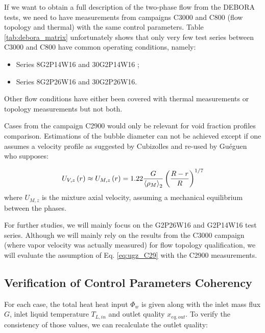 If we want to obtain a full description of the two-phase flow from the DEBORA tests, we need to have measurements from campaigns C3000 and C800 (flow topology and thermal) with the same control parameters. Table \ref{tab:debora_matrix} unfortunately shows that only very few test series between C3000 and C800 have common operating conditions, namely:

\begin{itemize}
\item Series 8G2P14W16 and 30G2P14W16 ;
\item Series 8G2P26W16 and 30G2P26W16.
\end{itemize}

Other flow conditions have either been covered with thermal measurements or topology measurements but not both. 

\begin{remark*}{}
Cases from the campaign C2900 would only be relevant for void fraction profiles comparison. Estimations of the bubble diameter can not be achieved except if one assumes a velocity profile as suggested by Cubizolles \cite{cubizolles_phd} and re-used by Guéguen \cite{gueguen_phd} who supposes:

\begin{equation}
U_{V,z}\left( r \right) \approx U_{M,z}\left( r \right) = 1.22 \frac{G}{\left< \rho_{M} \right>_{2}} \left(  \frac{R-r}{R} \right)^{1/7}
\label{eq:ugz_C29}
\end{equation}
where $U_{M,z}$ is the mixture axial velocity, assuming a mechanical equilibrium between the phases.

\end{remark*}


For further studies, we will mainly focus on the G2P26W16 and G2P14W16 test series. Although we will mainly rely on the results from the C3000 campaign (where vapor velocity was actually measured) for flow topology qualification, we will evaluate the assumption of Eq. \ref{eq:ugz_C29} with the C2900 measurements.


\subsection{Verification of Control Parameters Coherency}

For each case, the total heat heat input $\Phi_{w}$ is given along with the inlet mass flux $G$, inlet liquid temperature $T_{L,in}$ and outlet quality $x_{eq,out}$. To verify the consistency of those values, we can recalculate the outlet quality:

